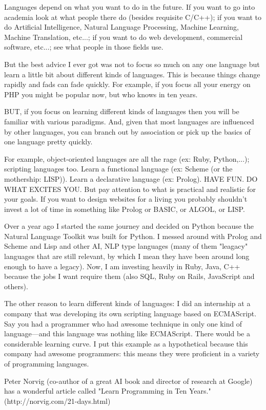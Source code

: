Languages depend on what you want to do in the future. If you want to go into academia look at what people there do (besides requisite C/C++); if you want to do Artificial Intelligence, Natural Language Processing, Machine Learning, Machine Translation, etc...; if you want to do web development, commercial software, etc...; see what people in those fields use.

But the best advice I ever got was not to focus so much on any one language but learn a little bit about different kinds of languages. This is because things change rapidly and fads can fade quickly. For example, if you focus all your energy on PHP you might be popular now, but who knows in ten years.

BUT, if you focus on learning different kinds of languages then you will be familiar with various paradigms. And, given that most languages are influenced by other languages, you can branch out by association or pick up the basics of one language pretty quickly.

For example, object-oriented languages are all the rage (ex: Ruby, Python,...); scripting languages too. Learn a functional language (ex: Scheme (or the mothership: LISP)). Learn a declarative language (ex: Prolog). HAVE FUN. DO WHAT EXCITES YOU. But pay attention to what is practical and realistic for your goals. If you want to design websites for a living you probably shouldn't invest a lot of time in something like Prolog or BASIC, or ALGOL, or LISP.

Over a year ago I started the same journey and decided on Python because the Natural Language Toolkit was built for Python. I messed around with Prolog and Scheme and Lisp and other AI, NLP type languages (many of them "leagacy" languages that are still relevant, by which I mean they have been around long enough to have a legacy). Now, I am investing heavily in Ruby, Java, C++ because the jobs I want require them (also SQL, Ruby on Rails, JavaScript and others).

The other reason to learn different kinds of languages: I did an internship at a company that was developing its own scripting language based on ECMAScript. Say you had a programmer who had awesome technique in only one kind of language---and this language was nothing like ECMAScript. There would be a considerable learning curve. I put this example as a hypothetical because this company had awesome programmers: this means they were proficient in a variety of programming languages.

Peter Norvig (co-author of a great AI book and director of research at Google) has a wonderful article called "Learn Programming in Ten Years." (http://norvig.com/21-days.html)
